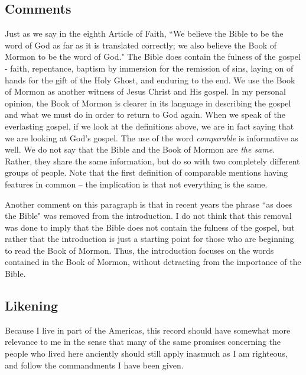 \documentclass[12pt]{report}
\begin{document}
\subsection{Comments\label{intro:comments1}}
Just as we say in the eighth Article of Faith, ``We believe the Bible to be the word of God as far as it is translated correctly; we also believe the Book of Mormon to be the word of God."  The Bible does contain the fulness of the gospel - faith, repentance, baptism by immersion for the remission of sins, laying on of hands for the gift of the Holy Ghost, and enduring to the end.  We use the Book of Mormon as another witness of Jesus Christ and His gospel.  In my personal opinion, the Book of Mormon is clearer in its language in describing the gospel and what we must do in order to return to God again.  When we speak of the everlasting gospel, if we look at the definitions above, we are in fact saying that we are looking at God's gospel.  The use of the word \emph{comparable} is informative as well.  We do not say that the Bible and the Book of Mormon are \emph{the same}.  Rather, they share the same information, but do so with two completely different groups of people.  Note that the first definition of comparable mentions having features in common -- the implication is that not everything is the same.

Another comment on this paragraph is that in recent years the phrase ``as does the Bible" was removed from the introduction.  I do not think that this removal was done to imply that the Bible does not contain the fulness of the gospel, but rather that the introduction is just a starting point for those who are beginning to read the Book of Mormon.  Thus, the introduction focuses on the words contained in the Book of Mormon, without detracting from the importance of the Bible.

\subsection{Likening\label{intro:likening1}}
Because I live in part of the Americas, this record should have somewhat more relevance to me in the sense that many of the same promises concerning the people who lived here anciently should still apply inasmuch as I am righteous, and follow the commandments I have been given.
\end{document}
